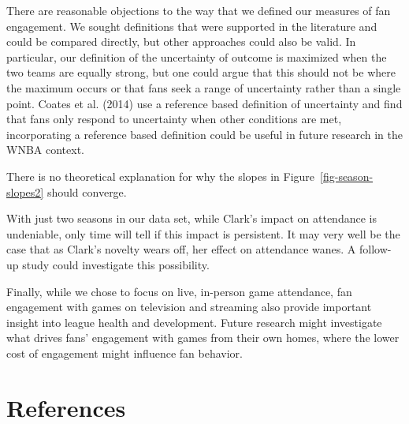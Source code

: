 \documentclass[
  letterpaper,
  DIV=11,
  numbers=noendperiod]{scrartcl}
\begin{document}
There are reasonable objections to the way that we defined our measures
of fan engagement. We sought definitions that were supported in the
literature and could be compared directly, but other approaches could
also be valid. In particular, our definition of the uncertainty of
outcome is maximized when the two teams are equally strong, but one
could argue that this should not be where the maximum occurs or that
fans seek a range of uncertainty rather than a single point. Coates et
al. (2014) use a reference based definition of uncertainty and find that
fans only respond to uncertainty when other conditions are met,
incorporating a reference based definition could be useful in future
research in the WNBA context.

There is no theoretical explanation for why the slopes in
Figure~\ref{fig-season-slopes2} should converge.

With just two seasons in our data set, while Clark's impact on
attendance is undeniable, only time will tell if this impact is
persistent. It may very well be the case that as Clark's novelty wears
off, her effect on attendance wanes. A follow-up study could investigate
this possibility.

Finally, while we chose to focus on live, in-person game attendance, fan
engagement with games on television and streaming also provide important
insight into league health and development. Future research might
investigate what drives fans' engagement with games from their own
homes, where the lower cost of engagement might influence fan behavior.

\section*{References}\label{references}
\end{document}
